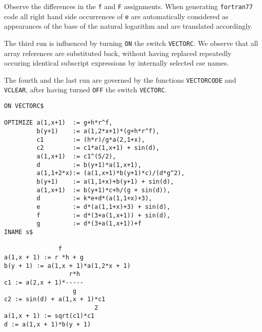 Observe the differences in the {\tt f} and {\tt F} assignments. When generating
{\tt fortran77} code all right hand side occurrences of {\tt e} are
automatically considered as appearances of the base of the natural logarithm
and are translated accordingly.

The third run is influenced by turning {\tt ON} the switch {\tt VECTORC}.
We observe that all array references are substituted back, without having
replaced repeatedly occuring identical subscript expressions by internally
selected cse names.

The fourth and the last run are governed by the functions {\tt VECTORCODE} and
{\tt VCLEAR}, after having turned {\tt OFF} the switch {\tt VECTORC}.
{\small
\begin{verbatim}
ON VECTORC$

OPTIMIZE a(1,x+1)  := g+h*r^f,
         b(y+1)    := a(1,2*x+1)*(g+h*r^f),
         c1        := (h*r)/g*a(2,1+x),
         c2        := c1*a(1,x+1) + sin(d),
         a(1,x+1)  := c1^(5/2),
         d         := b(y+1)*a(1,x+1),
         a(1,1+2*x):= (a(1,x+1)*b(y+1)*c)/(d*g^2),
         b(y+1)    := a(1,1+x)+b(y+1) + sin(d),
         a(1,x+1)  := b(y+1)*c+h/(g + sin(d)),
         d         := k*e+d*(a(1,1+x)+3),
         e         := d*(a(1,1+x)+3) + sin(d),
         f         := d*(3+a(1,x+1)) + sin(d),
         g         := d*(3+a(1,x+1))+f
INAME s$

               f
a(1,x + 1) := r *h + g
b(y + 1) := a(1,x + 1)*a(1,2*x + 1)
                  r*h
c1 := a(2,x + 1)*-----
                   g
c2 := sin(d) + a(1,x + 1)*c1
                         2
a(1,x + 1) := sqrt(c1)*c1
d := a(1,x + 1)*b(y + 1)
\end{verbatim}}
\newpage
